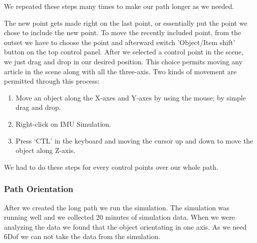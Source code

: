 We repeated these steps many times to make our path longer as we needed. 

The new point gets made right on the last point, or essentially put the point we chose to include the new point. To move the recently included point, from the outset we have to choose the point and afterward switch 'Object/Item shift' button on the top control panel. After we selected a control point in the scene, we just drag and drop in our desired position. This choice permits moving any article in the scene along with all the three-axis. Two kinds of movement are permitted through this process:

\begin{enumerate}
  \item Move an object along the X-axes and Y-axes by using the mouse; by simple drag and drop.
  \item Right-click on IMU Simulation.
  \item Press ‘CTL’ in the keyboard and moving the cursor up and down to move the object along Z-axis.
\end{enumerate}

We had to do these steps for every control points over our whole path.


\subsubsection{Path Orientation}

After we created the long path we run the simulation. The simulation was running well and we collected 20 minutes of simulation data. When we were analyzing the data we found that the object orientating in one axis. As we need 6Dof we can not take the data from the simulation.




